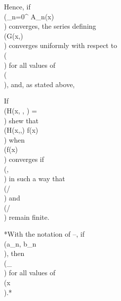 Hence, if \\(\sum_{n=0}^{\infty} A_{n}(x)\\) converges, the series defining \\(G(x,\alpha)\\)
converges uniformly with respect to \\(\alpha\\) for all values of \\(\alpha\\), and, as stated above,
\\[ 
\lim_{\alpha \rightarrow \infty} G(x, \alpha)
= G(x,0)
= A_{0} + \sum_{n=1}^{\infty} A_{n}(x)
= f(x).
\\] 

\begin{wandwexample}
  If
  \\(H(x, \alpha, \beta) = \\)
  shew that \\(H(x,\alpha,\beta) \rightarrow f(x)\\) when \\(f(x)\\) converges if
  \\(\alpha,\beta {}\\) in such a
  way that \\(\alpha/\beta\\) and \\(\beta/\alpha\\) remain finite.
\end{wandwexample}
*With the notation of
--, %
if
\\(a_{n}, b_{n} \\), then
\\(\lim_{\alpha {}} \\) for all values of \\(x\\).*

